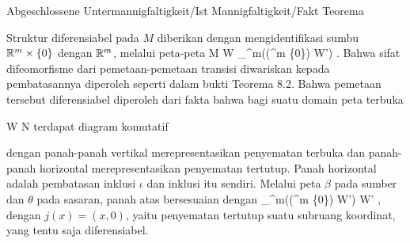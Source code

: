 {Abgeschlossene Untermannigfaltigkeit/Ist Mannigfaltigkeit/Fakt}
{Teorema}
{}
{

\faktzusatz {}
\faktzusatz {}

}
{

Struktur diferensiabel pada $M$ diberikan dengan mengidentifikasi sumbu
${\mathbb R}^m\times\{0\}$ dengan ${\mathbb R}^m$, melalui peta-peta
 {M \cap W} {_{\R^m}\bigl((\R^m \times \{0\}) \cap W'\bigr)
} {}
.
Bahwa sifat difeomorfisme dari pemetaan-pemetaan transisi diwariskan kepada pembatasannya diperoleh seperti dalam bukti
Teorema 8.2.
Bahwa pemetaan tersebut diferensiabel diperoleh dari fakta bahwa bagi suatu domain peta terbuka

\mavergleichskette
{\vergleichskette
{ W
}
{ \subseteq }{ N
}
{  }{
}
{    }{
}
{   }{
}
}
{}{}{}
terdapat diagram komutatif

 {  }

dengan panah-panah vertikal merepresentasikan penyematan terbuka dan panah-panah horizontal merepresentasikan penyematan tertutup. Panah horizontal adalah pembatasan inklusi $\iota$ dan inklusi itu sendiri. Melalui peta $\beta$ pada sumber dan $\theta$ pada sasaran, panah atas bersesuaian dengan
 {_{\R^m}\bigl((\R^m \times \{0\}) \cap W'\bigr)} {W'
} {,}
dengan $j(x)=(x,0)$, yaitu penyematan tertutup suatu subruang koordinat, yang tentu saja diferensiabel.

}



